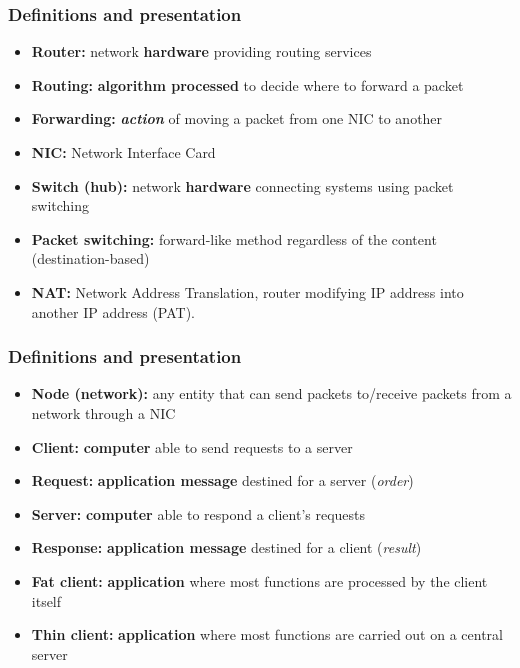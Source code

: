   \begin{frame}
    \frametitle{Definitions and presentation}
      \begin{itemize}
        \item \textbf{Router:} network \textbf{hardware} providing routing services
        \item \textbf{Routing:} \textbf{algorithm processed} to decide where to forward a packet
        \item \textbf{Forwarding:} \textbf{\emph{action}} of moving a packet from one NIC to another
        \item \textbf{NIC:} Network Interface Card
        \item \textbf{Switch (hub):} network \textbf{hardware} connecting systems using packet switching
        \item \textbf{Packet switching:} forward-like method regardless of the content (destination-based)
        \item \textbf{NAT:} Network Address Translation, router modifying IP address into another IP address (PAT).
      \end{itemize}
  \end{frame}
  \begin{frame}
    \frametitle{Definitions and presentation}
      \begin{itemize}
        \item \textbf{Node (network):} any entity that can send packets to/receive packets from a network through a NIC
        \item \textbf{Client:} \textbf{computer} able to send requests to a server
        \item \textbf{Request:} \textbf{application message} destined for a server (\emph{order})
        \item \textbf{Server:} \textbf{computer} able to respond a client's requests
        \item \textbf{Response:} \textbf{application message} destined for a client (\emph{result})
        \item \textbf{Fat client:} \textbf{application} where most functions are processed by the client itself
        \item \textbf{Thin client:} \textbf{application} where most functions are carried out on a central server
      \end{itemize}
  \end{frame}

